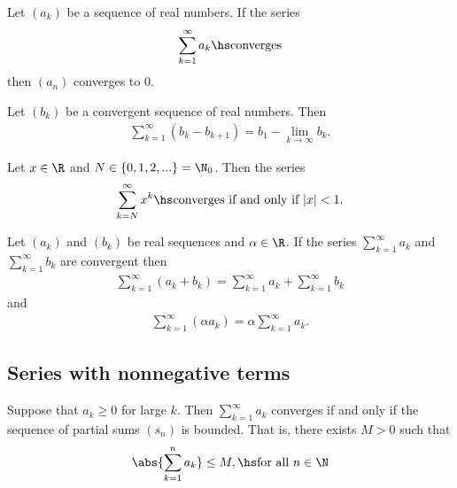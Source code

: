 \documentclass{article}
\begin{document}
\begin{theorem}
    Let $(a_k)$ be a sequence of real numbers. If the series
    \begin{align*}
        \sum_{k=1}^\infty a_k\hs\text{converges}
    \end{align*}
    then $(a_n)$ converges to $0$.
\end{theorem}

\begin{theorem}
    Let $(b_k)$ be a convergent sequence of real numbers. Then
    \begin{align*}
        \sum_{k=1}^\infty (b_k - b_{k+1})=b_1-\lim_{k\to\infty}b_k.
    \end{align*}
\end{theorem}

\setcounter{theorem}{10}
\begin{theorem}
    Let $x\in\R$ and $N\in\{0,1,2,...\}=\N_0$. Then the series
    \begin{align*}
        \sum_{k=N}^\infty x^k\hs\text{converges if and only if }|x|<1.
    \end{align*}
\end{theorem}

\begin{theorem}
    Let $(a_k)$ and $(b_k)$ be real sequences and $\alpha\in\R$. If the
    series $\sum_{k=1}^\infty a_k$ and $\sum_{k=1}^\infty b_k$ are convergent
    then
    \begin{align*}
        \sum_{k=1}^\infty (a_k+b_k)=\sum_{k=1}^\infty a_k + \sum_{k=1}^\infty b_k
    \end{align*}
    and
    \begin{align*}
        \sum_{k=1}^\infty (\alpha a_k)=\alpha \sum_{k=1}^\infty a_k.
    \end{align*}
\end{theorem}

\subsection{Series with nonnegative terms}

\begin{theorem}
    Suppose that $a_k\geq 0$ for large $k$. Then $\sum_{k=1}^\infty a_k$ converges
    if and only if the sequence of partial sums $(s_n)$ is bounded. That is,
    there exists $M>0$ such that
    \begin{align*}
        \abs{\sum_{k=1}^na_k}\leq M,\hs\text{for all }n\in\N
    \end{align*}
\end{theorem}
\end{document}
